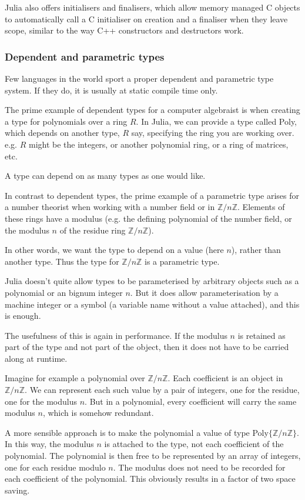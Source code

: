 \documentclass[a4paper,10pt]{article}
\newcommand{\Z}{\mathbb{Z}}
\begin{document}
Julia also offers initialisers and finalisers, which allow memory managed C objects to 
automatically call a C initialiser on creation and a finaliser when they leave scope, similar
to the way C++ constructors and destructors work.

\subsubsection{Dependent and parametric types}

Few languages in the world sport a proper dependent and parametric type system. If they
do, it is usually at static compile time only.

The prime example of dependent types for a computer algebraist is when creating a type for
polynomials over a ring $R$. In Julia, we can provide a type called Poly, which depends on
another type, $R$ say, specifying the ring you are working over. e.g. $R$ might be the
integers, or another polynomial ring, or a ring of matrices, etc.

A type can depend on as many types as one would like.

In contrast to dependent types, the prime example of a parametric type arises for a number 
theorist when working with a number field or in $\Z/n\Z$. Elements of these rings have a
modulus (e.g. the defining polynomial of the number field, or the modulus $n$ of the residue
ring $\Z/n\Z$).

In other words, we want the type to depend on a value (here $n$), rather than another
type. Thus the type for $\Z/n\Z$ is a parametric type.

Julia doesn't quite allow types to be parameterised by arbitrary objects such as a
polynomial or an bignum integer $n$. But it does allow parameterisation by a machine
integer or a symbol (a variable name without a value attached), and this is enough.

The usefulness of this is again in performance. If the modulus $n$ is retained as part of
the type and not part of the object, then it does not have to be carried along at
runtime. 

Imagine for example a polynomial over $\Z/n\Z$. Each coefficient is an object in $\Z/n\Z$.
We can represent each such value by a pair of integers, one for the residue, one for the
modulus $n$. But in a polynomial, every coefficient will carry the same modulus $n$, which
is somehow redundant.

A more sensible approach is to make the polynomial a value of type Poly$\{\Z/n\Z\}$.
In this way, the modulus $n$ is attached to the type, not each coefficient of the
polynomial. The polynomial is then free to be represented by an array of integers, one for
each residue modulo $n$. The modulus does not need to be recorded for each coefficient of 
the polynomial. This obviously results in a factor of two space saving.
\end{document}
